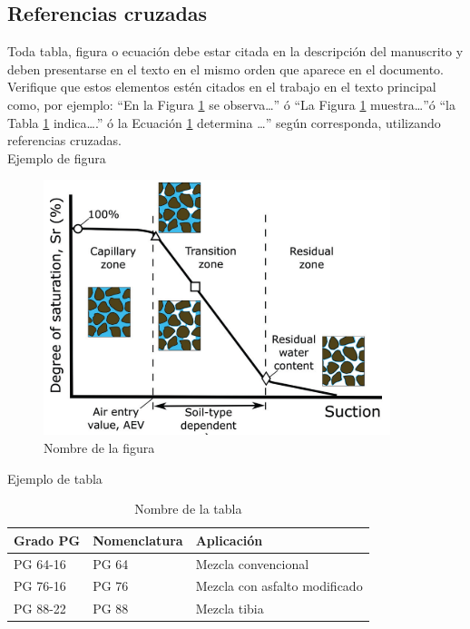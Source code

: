 \documentclass[11pt,letterpaper]{article}
\begin{document}
\subsection{Referencias cruzadas}
Toda tabla, figura o ecuación debe estar citada en la descripción del manuscrito y deben presentarse en el texto en el mismo orden que aparece en el documento. Verifique que estos elementos estén citados en el trabajo en el texto principal como, por ejemplo: “En la Figura \ref{fig: Ejemplo} se observa…” ó “La Figura \ref{fig: Ejemplo} muestra…”ó “la Tabla \ref{fig: Ejemplo} indica….” ó la Ecuación \ref{fig: Ejemplo} determina …” según corresponda, utilizando referencias cruzadas.\\

Ejemplo de figura


\begin{figure}[H]
    \centering
    \includegraphics[scale=0.6]{Imagenes/SWCC.PNG}
    \caption{Nombre de la figura}
    \label{fig: Ejemplo}
\end{figure}

Ejemplo de tabla

\begin{table}[htbp]
  \centering
  \caption{Nombre de la tabla}
    \begin{tabular}{p{7.855em}p{7.855em}p{15.5em}}
    \hline
    \textbf{Grado PG} & \textbf{Nomenclatura} & \textbf{Aplicación} \\
    \hline
    PG 64-16 & PG 64 & Mezcla convencional \\
    PG 76-16 & PG 76 & Mezcla con asfalto modificado \\
    PG 88-22 & PG 88 & Mezcla tibia \\
    \hline
    \end{tabular}%
  \label{tab: Ejemplo}%
\end{table}%
\end{document}
